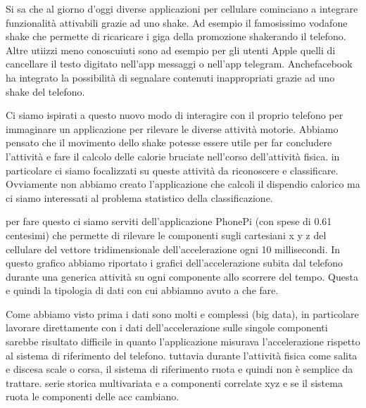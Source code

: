 
%
Si sa che al giorno d\rq{}oggi diverse applicazioni per cellulare cominciano a integrare funzionalità attivabili grazie ad uno shake. Ad esempio il famosissimo vodafone shake che permette di ricaricare i giga della promozione shakerando il telefono. Altre utiizzi meno conoscuiuti sono ad esempio per gli utenti Apple quelli di cancellare il testo digitato nell\rq{}app messaggi o nell\rq{}app telegram. Anchefacebook ha integrato la 
possibilità di segnalare contenuti inappropriati grazie ad uno shake del telefono.
%

%
Ci siamo ispirati a questo nuovo modo di interagire con il proprio telefono per immaginare un applicazione per rilevare le diverse attività motorie. Abbiamo pensato che il movimento dello shake potesse essere utile per far concludere l\rq{}attività e fare il calcolo delle calorie bruciate nell\rq{}corso dell\rq{}attività fisica.
in particolare ci siamo focalizzati su queste attività da riconoscere e classificare.
Ovviamente non abbiamo creato l\rq{}applicazione che calcoli il dispendio calorico ma ci siamo interessati al problema statistico della classificazione. 
%

%
per fare questo ci siamo serviti dell\rq{}applicazione PhonePi (con spese di 0.61 centesimi)  che permette di rilevare le componenti sugli cartesiani x y z del cellulare del vettore tridimensionale dell\rq{}accelerazione ogni 10 millisecondi.
In questo grafico abbiamo riportato i grafici dell\rq{}accelerazione subita dal telefono durante una generica attività su ogni componente allo scorrere del tempo. 
Questa e quindi la tipologia di dati con cui abbiamno avuto a che fare. 
%

%
Come abbiamo visto prima i dati sono molti e complessi (big data), in particolare lavorare direttamente con i dati dell\rq{}accelerazione sulle singole componenti sarebbe risultato difficile in quanto l\rq{}applicazione misurava l\rq{}accelerazione rispetto al sistema di riferimento del telefono. tuttavia durante l\rq{}attività fisica come salita e discesa scale o corsa, il sistema di riferimento ruota e quindi non è semplice da trattare. serie storica multivariata e a componenti correlate xyz e se il sistema ruota le componenti delle acc cambiano.
%

